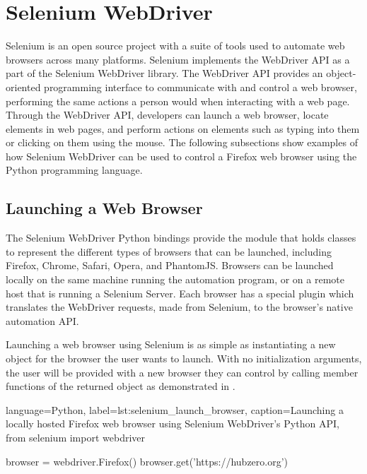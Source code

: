 \section{Selenium WebDriver}
\label{sec:external_libs_selenium}



Selenium is an open source project with a suite of tools used to automate web
browsers across many platforms. Selenium implements the WebDriver API as a part
of the Selenium WebDriver library. The WebDriver API provides an
object-oriented programming interface to communicate with and control a web
browser, performing the same actions a person would when interacting with a web
page.  Through the WebDriver API, developers can launch a web browser, locate
elements in web pages, and perform actions on elements such as typing into them
or clicking on them using the mouse. The following subsections show examples of
how Selenium WebDriver can be used to control a Firefox web browser using the
Python programming language.

\subsection{Launching a Web Browser}
\label{ssec:external_libs_selenium_launch_browser}

The Selenium WebDriver Python bindings provide the 
module that holds classes to represent the different types of browsers that
can be launched, including Firefox, Chrome, Safari, Opera, and PhantomJS.
Browsers can be launched locally on the same machine running the automation
program, or on a remote host that is running a Selenium Server. Each browser
has a special plugin which translates the WebDriver requests,
made from Selenium, to the browser's native automation API.

Launching a web browser using Selenium is as simple as instantiating a new
 object for the browser the user wants to launch. With no
initialization arguments, the user will be provided with a new browser they can
control by calling member functions of the returned object as demonstrated in
.


\begin{xcode}{%
  language=Python,%
  label=lst:selenium_launch_browser,%
  caption={Launching a locally hosted Firefox web browser using Selenium WebDriver's Python API},%
}
from selenium import webdriver

browser = webdriver.Firefox()
browser.get('https://hubzero.org')
\end{xcode}


